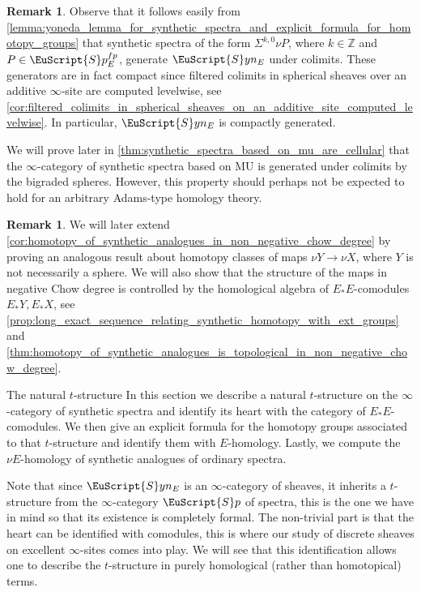 \documentclass[oneside,a4paper]{amsart}
\makeatletter
\newcommand{\euscr}[1]{\EuScript{#1}} %
\newcommand{\MU}{\mathrm{MU}} %
\newcommand{\spectra}{\euscr{S}p} %
\newcommand{\synspectra}{\euscr{S}yn} %
\theoremstyle{plain}
\theoremstyle{definition}
\newtheorem{rem}[thm]{Remark}
\theoremstyle{remark}
\def\subsection{\@startsection{subsection}{1}%
  \z@{.7\linespacing\@plus\linespacing}{.5\linespacing}%
  {\normalfont\bfseries\centering}}%
\makeatother
\begin{document}
\begin{rem}
\label{rem:synthetic_spectra_compactly_generated_by_suspensions_of_synthetic_analogues_of_finite_projectives}
Observe that it follows easily from \cref{lemma:yoneda_lemma_for_synthetic_spectra_and_explicit_formula_for_homotopy_groups} that synthetic spectra of the form $\Sigma^{k, 0} \nu P$, where $k \in \mathbb{Z}$ and $P \in \spectra_{E}^{fp}$, generate $\synspectra_{E}$ under colimits. These generators are in fact compact since filtered colimits in spherical sheaves over an additive $\infty$-site are computed levelwise, see \cref{cor:filtered_colimits_in_spherical_sheaves_on_an_additive_site_computed_levelwise}. In particular, $\synspectra_{E}$ is compactly generated. 

We will prove later in \cref{thm:synthetic_spectra_based_on_mu_are_cellular} that the $\infty$-category of synthetic spectra based on $\MU$ is generated under colimits by the bigraded spheres. However, this property should perhaps not be expected to hold for an arbitrary Adams-type homology theory. 
\end{rem}

\begin{rem}
We will later extend \cref{cor:homotopy_of_synthetic_analogues_in_non_negative_chow_degree} by proving an analogous result about homotopy classes of maps $\nu Y \rightarrow \nu X$, where $Y$ is not necessarily a sphere. We will also show that the structure of the maps in negative Chow degree is controlled by the homological algebra of $E_{*}E$-comodules $E_{*}Y, E_{*}X$, see \cref{prop:long_exact_sequence_relating_synthetic_homotopy_with_ext_groups} and \cref{thm:homotopy_of_synthetic_analogues_is_topological_in_non_negative_chow_degree}. 
\end{rem}

\subsection{The natural $t$-structure} 
In this section we describe a natural $t$-structure on the $\infty$-category of synthetic spectra and identify its heart with the category of $E_{*}E$-comodules. We then give an explicit formula for the homotopy groups associated to that $t$-structure and identify them with $E$-homology. Lastly, we compute the $\nu E$-homology of synthetic analogues of ordinary spectra. 

Note that since $\synspectra_{E}$ is an $\infty$-category of sheaves, it inherits a $t$-structure from the $\infty$-category $\spectra$ of spectra, this is the one we have in mind so that its existence is completely formal. The non-trivial part is that the heart can be identified with comodules, this is where our study of discrete sheaves on excellent $\infty$-sites comes into play. We will see that this identification allows one to describe the $t$-structure in purely homological (rather than homotopical) terms.
\end{document}
